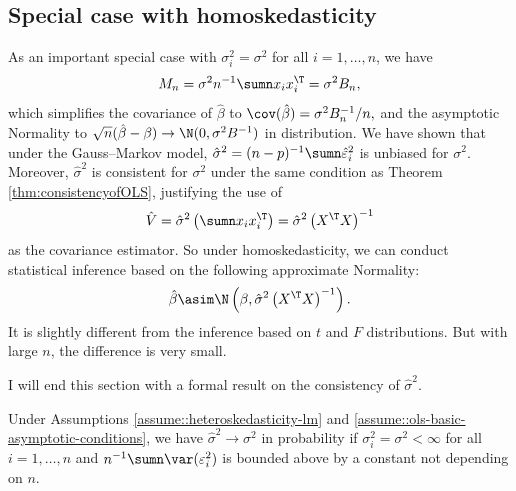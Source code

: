 \subsection{Special case with homoskedasticity}
As an important special case with $\sigma_{i}^{2}=\sigma^{2}$ for
all $i=1,\ldots,n$, we have 
\[
M_{n}=\sigma^{2}n^{-1}\sumn x_{i}x_{i}^{\T}=\sigma^{2}B_{n},
\]
which simplifies the covariance of $\hat{\beta}$ to $\cov(\hat{\beta})=\sigma^{2}B_{n}^{-1} / n,$
and the asymptotic Normality to $\sqrt{n}(\hat{\beta}-\beta)\rightarrow\N(0,\sigma^{2}B^{-1})$
in distribution. We have shown that under the Gauss--Markov model,
$\hat{\sigma}^{2}=(n-p)^{-1}\sumn\hat{\varepsilon}_{i}^{2}$ is unbiased
for $\sigma^{2}$. Moreover, $\hat{\sigma}^{2}$ is consistent for
$\sigma^{2}$ under the same condition as Theorem \ref{thm:consistencyofOLS},
justifying the use of 
\[
\hat{V} = 
\hat{\sigma}^{2}\left(\sumn x_{i}x_{i}^{\T}\right)=\hat{\sigma}^{2}\left(X^{\T}X\right)^{-1}
\]
as the covariance estimator. So under homoskedasticity, we can conduct statistical inference based on the following approximate Normality:
\[
\hat{\beta}\asim\N\left(\beta,\hat{\sigma}^{2}\left(X^{\T}X\right)^{-1}\right).
\]
It is slightly different from the inference based on $t$ and $F$ distributions. But with large $n$, the difference is very small.


I will end this section with a formal result on the consistency of
$\hat{\sigma}^{2}.$



\begin{theorem}\label{thm::homoskeda-asymptotic}
Under Assumptions \ref{assume::heteroskedasticity-lm} and \ref{assume::ols-basic-asymptotic-conditions},  we have $\hat{\sigma}^{2}\rightarrow\sigma^{2}$ in probability if 
 $\sigma_{i}^{2}=\sigma^{2}<\infty$ for all $i=1,\ldots,n$ and $n^{-1} \sumn \var(\varepsilon_i^2  ) $ is bounded above by a constant not depending on $n$. 
\end{theorem}

